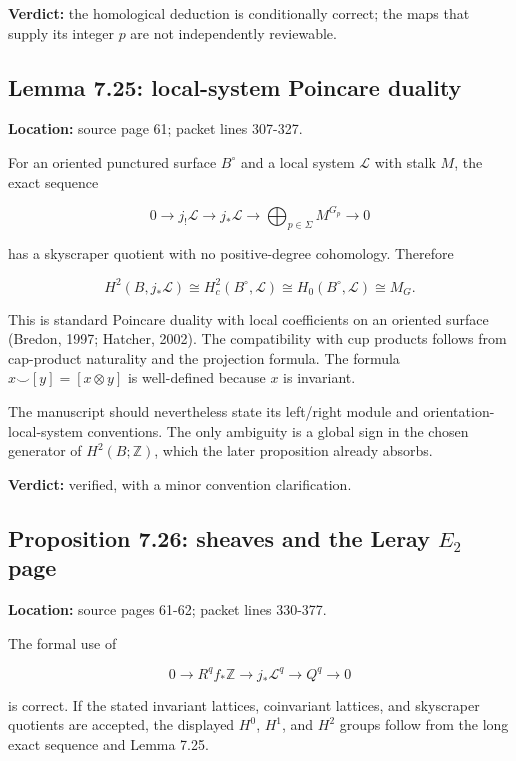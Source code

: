 \documentclass[
  10pt,
]{article}
\begin{document}
\textbf{Verdict:} the homological deduction is conditionally correct;
the maps that supply its integer \(p\) are not independently reviewable.

\subsection{Lemma 7.25: local-system Poincare
duality}\label{lemma-7.25-local-system-poincare-duality}

\textbf{Location:} source page 61; packet lines 307-327.

For an oriented punctured surface \(B^\circ\) and a local system
\(\mathcal L\) with stalk \(M\), the exact sequence

\[
0\to j_!\mathcal L\to j_*\mathcal L
 \to\bigoplus_{p\in\Sigma}M^{G_p}\to0
\]

has a skyscraper quotient with no positive-degree cohomology. Therefore

\[
H^2(B,j_*\mathcal L)
 \cong H_c^2(B^\circ,\mathcal L)
 \cong H_0(B^\circ,\mathcal L)
 \cong M_G.
\]

This is standard Poincare duality with local coefficients on an oriented
surface (Bredon, 1997; Hatcher, 2002). The compatibility with cup
products follows from cap-product naturality and the projection formula.
The formula \(x\smile[y]=[x\otimes y]\) is well-defined because \(x\) is
invariant.

The manuscript should nevertheless state its left/right module and
orientation-local-system conventions. The only ambiguity is a global
sign in the chosen generator of \(H^2(B;\mathbb Z)\), which the later
proposition already absorbs.

\textbf{Verdict:} verified, with a minor convention clarification.

\subsection{\texorpdfstring{Proposition 7.26: sheaves and the Leray
\(E_2\)
page}{Proposition 7.26: sheaves and the Leray E\_2 page}}\label{proposition-7.26-sheaves-and-the-leray-e_2-page}

\textbf{Location:} source pages 61-62; packet lines 330-377.

The formal use of

\[
0\to R^qf_*\mathbb Z\to j_*\mathcal L^q\to Q^q\to0
\]

is correct. If the stated invariant lattices, coinvariant lattices, and
skyscraper quotients are accepted, the displayed \(H^0\), \(H^1\), and
\(H^2\) groups follow from the long exact sequence and Lemma 7.25.
\end{document}

